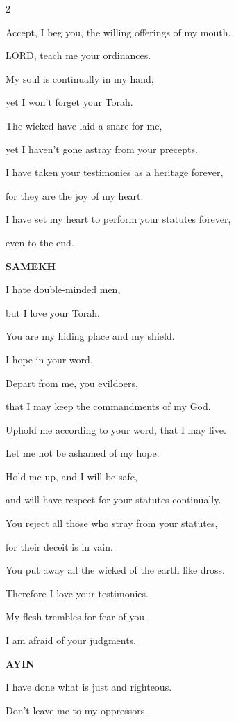 \begin{multicols}{2}
	
	\myverse{}Accept, I beg you, the willing offerings of my mouth.
	
	LORD, teach me your ordinances.
	
	
	\myverse{}My soul is continually in my hand,
	
	yet I won’t forget your Torah.
	
	
	\myverse{}The wicked have laid a snare for me,
	
	yet I haven’t gone astray from your precepts.
	
	
	\myverse{}I have taken your testimonies as a heritage forever,
	
	for they are the joy of my heart.
	
	
	\myverse{}I have set my heart to perform your statutes forever,
	
	even to the end.
	
	\vspace{\baselineskip}
	\textbf{SAMEKH}
	
	
	\myverse{}I hate double-minded men,
	
	but I love your Torah.
	
	
	\myverse{}You are my hiding place and my shield.
	
	I hope in your word.
	
	
	\myverse{}Depart from me, you evildoers,
	
	that I may keep the commandments of my God.
	
	
	\myverse{}Uphold me according to your word, that I may live.
	
	Let me not be ashamed of my hope.
	
	
	\myverse{}Hold me up, and I will be safe,
	
	and will have respect for your statutes continually.
	
	
	\myverse{}You reject all those who stray from your statutes,
	
	for their deceit is in vain.
	
	
	\myverse{}You put away all the wicked of the earth like dross.
	
	Therefore I love your testimonies.
	
	
	\myverse{}My flesh trembles for fear of you.
	
	I am afraid of your judgments.
	
	\vspace{\baselineskip}
	\textbf{AYIN}
	
	
	\myverse{}I have done what is just and righteous.
	
	Don’t leave me to my oppressors.
	

\end{multicols}
